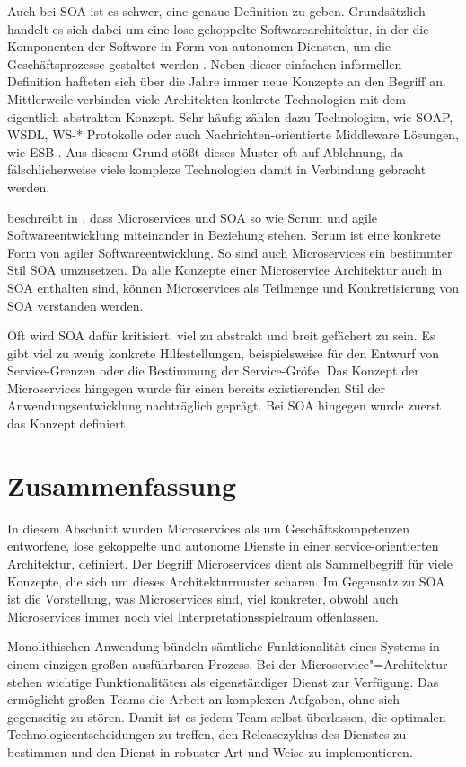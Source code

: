 Auch bei SOA ist es schwer, eine genaue Definition zu geben. Grundsätzlich handelt es sich dabei um eine lose gekoppelte Softwarearchitektur, in der die Komponenten der Software in Form von autonomen Diensten, um die Geschäftsprozesse gestaltet werden \cite{soaRW}. Neben dieser einfachen informellen Definition hafteten sich über die Jahre immer neue Konzepte an den Begriff an. Mittlerweile verbinden viele Architekten konkrete Technologien mit dem eigentlich abstrakten Konzept. Sehr häufig zählen dazu Technologien, wie SOAP, WSDL, WS-* Protokolle oder auch Nachrichten-orientierte Middleware Lösungen, wie ESB \cite{fowlerGoTo}. Aus diesem Grund stößt dieses Muster oft auf Ablehnung, da fälschlicherweise viele komplexe Technologien damit in Verbindung gebracht werden.

\citeauthor{newman2015building} beschreibt in \cite[8]{newman2015building}, dass Microservices und SOA so wie Scrum und agile Softwareentwicklung miteinander in Beziehung stehen. Scrum ist eine konkrete Form von agiler Softwareentwicklung. So sind auch Microservices ein bestimmter Stil SOA umzusetzen. Da alle Konzepte einer Microservice Architektur auch in SOA enthalten sind, können Microservices als Teilmenge und Konkretisierung von SOA verstanden werden.

Oft wird SOA dafür kritisiert, viel zu abstrakt und breit gefächert zu sein. Es gibt viel zu wenig konkrete Hilfestellungen, beispielsweise für den Entwurf von Service-Grenzen oder die Bestimmung der Service-Größe. Das Konzept der Microservices hingegen wurde für einen bereits existierenden Stil der Anwendungsentwicklung nachträglich geprägt. Bei SOA hingegen wurde zuerst das Konzept definiert.

\section{Zusammenfassung}

In diesem Abschnitt wurden Microservices als um Geschäftskompetenzen entworfene, lose gekoppelte und autonome Dienste in einer service-orientierten Architektur, definiert. Der Begriff Microservices dient als Sammelbegriff für viele Konzepte, die sich um dieses Architekturmuster scharen. Im Gegensatz zu SOA ist die Vorstellung, was Microservices sind, viel konkreter, obwohl auch Microservices immer noch viel Interpretationsspielraum offenlassen.

Monolithischen Anwendung bündeln sämtliche Funktionalität eines Systems in einem einzigen großen ausführbaren Prozess. Bei der Microservice"=Architektur stehen wichtige Funktionalitäten als eigenständiger Dienst zur Verfügung. Das ermöglicht großen Teams die Arbeit an komplexen Aufgaben, ohne sich gegenseitig zu stören. Damit ist es jedem Team selbst überlassen, die optimalen Technologieentscheidungen zu treffen, den Releasezyklus des Dienstes zu bestimmen und den Dienst in robuster Art und Weise zu implementieren.

